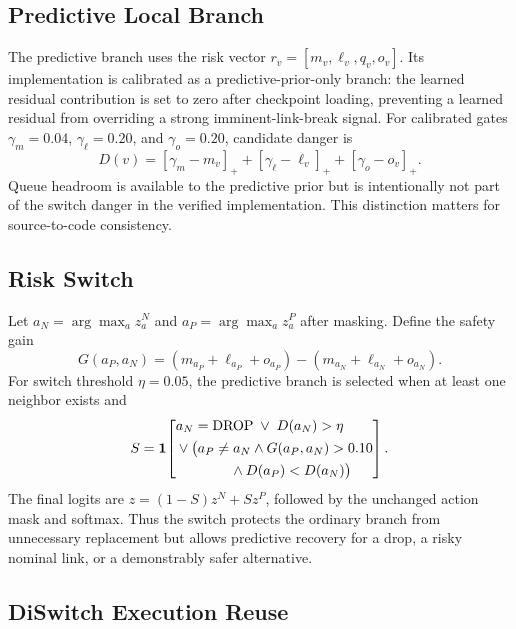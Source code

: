 \documentclass{ieeeaccess}
\newcommand{\drop}{\mathrm{DROP}}
\begin{document}
\subsection{Predictive Local Branch}

The predictive branch uses the risk vector $r_v=[m_v,\ell_v,q_v,o_v]$. Its implementation is calibrated as a predictive-prior-only branch: the learned residual contribution is set to zero after checkpoint loading, preventing a learned residual from overriding a strong imminent-link-break signal. For calibrated gates $\gamma_m=0.04$, $\gamma_\ell=0.20$, and $\gamma_o=0.20$, candidate danger is
\begin{equation}
D(v)=[\gamma_m-m_v]_+ + [\gamma_\ell-\ell_v]_+ + [\gamma_o-o_v]_+.
\label{eq:danger}
\end{equation}
Queue headroom is available to the predictive prior but is intentionally not part of the switch danger in the verified implementation. This distinction matters for source-to-code consistency.

\subsection{Risk Switch}

Let $a_N=\arg\max_a z^N_a$ and $a_P=\arg\max_a z^P_a$ after masking. Define the safety gain
\begin{equation}
G(a_P,a_N)=(m_{a_P}+\ell_{a_P}+o_{a_P})-(m_{a_N}+\ell_{a_N}+o_{a_N}).
\end{equation}
For switch threshold $\eta=0.05$, the predictive branch is selected when at least one neighbor exists and
\begin{equation}
S=\mathbf{1}\!\left[
\begin{aligned}
&a_N=\drop\;\lor\;D(a_N)>\eta\\
&{}\lor\big(a_P\neq a_N\land G(a_P,a_N)>0.10\\
&\hspace{3.9em}{}\land D(a_P)<D(a_N)\big)
\end{aligned}
\right].
\label{eq:switch}
\end{equation}
The final logits are $z=(1-S)z^N+Sz^P$, followed by the unchanged action mask and softmax. Thus the switch protects the ordinary branch from unnecessary replacement but allows predictive recovery for a drop, a risky nominal link, or a demonstrably safer alternative.

\subsection{DiSwitch Execution Reuse}
\end{document}

